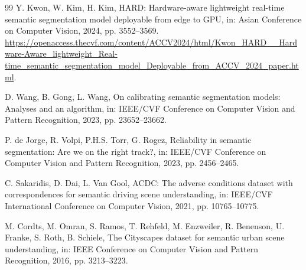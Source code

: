 \documentclass[a4paper,review,12pt]{elsarticle}
\begin{document}
\begin{thebibliography}{99}
Y. Kwon, W. Kim, H. Kim,
HARD: Hardware-aware lightweight real-time semantic segmentation model deployable from edge to GPU,
in: Asian Conference on Computer Vision, 2024, pp. 3552--3569.
\url{https://openaccess.thecvf.com/content/ACCV2024/html/Kwon_HARD__Hardware-Aware_lightweight_Real-time_semantic_segmentation_model_Deployable_from_ACCV_2024_paper.html}.

D. Wang, B. Gong, L. Wang,
On calibrating semantic segmentation models: Analyses and an algorithm,
in: IEEE/CVF Conference on Computer Vision and Pattern Recognition, 2023, pp. 23652--23662.

P. de Jorge, R. Volpi, P.H.S. Torr, G. Rogez,
Reliability in semantic segmentation: Are we on the right track?,
in: IEEE/CVF Conference on Computer Vision and Pattern Recognition, 2023, pp. 2456--2465.

C. Sakaridis, D. Dai, L. Van Gool,
ACDC: The adverse conditions dataset with correspondences for semantic driving scene understanding,
in: IEEE/CVF International Conference on Computer Vision, 2021, pp. 10765--10775.

M. Cordts, M. Omran, S. Ramos, T. Rehfeld, M. Enzweiler, R. Benenson, U. Franke, S. Roth, B. Schiele,
The Cityscapes dataset for semantic urban scene understanding,
in: IEEE Conference on Computer Vision and Pattern Recognition, 2016, pp. 3213--3223.

\end{thebibliography}
\end{document}
